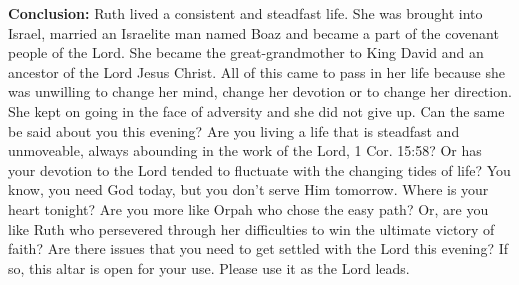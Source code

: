 \textbf{Conclusion: }Ruth lived a consistent and steadfast life. She was brought into Israel, married an Israelite man named Boaz and became a part of the covenant people of the Lord. She became the great-grandmother to King David and an ancestor of the Lord Jesus Christ. All of this came to pass in her life because she was unwilling to change her mind, change her devotion or to change her direction. She kept on going in the face of adversity and she did not give up. Can the same be said about you this evening? Are you living a life that is steadfast and unmoveable, always abounding in the work of the Lord, 1 Cor. 15:58? Or has your devotion to the Lord tended to fluctuate with the changing tides of life? You know, you need God today, but you don't serve Him tomorrow. Where is your heart tonight? Are you more like Orpah who chose the easy path? Or, are you like Ruth who persevered through her difficulties to win the ultimate victory of faith? Are there issues that you need to get settled with the Lord this evening? If so, this altar is open for your use. Please use it as the Lord leads.
